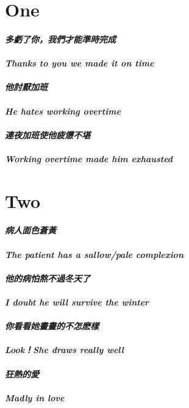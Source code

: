 \documentclass[12pt]{book}
\begin{document}
\chapter*{One}
\paragraph{多虧了你，我們才能準時完成\\\\Thanks to you we made it on time\\\\他討厭加班\\\\He hates working overtime\\\\連夜加班使他疲憊不堪\\\\Working overtime made him exhausted}

\chapter*{Two}
\paragraph{病人面色蒼黃\\\\The patient has a sallow/pale complexion\\\\他的病怕熬不過冬天了\\\\I doubt he will survive the winter\\\\
你看看她畫畫的不怎麽樣\\\\Look！She draws really well\\\\狂熱的愛\\\\Madly in love}

\paragraph{}
\end{document}
